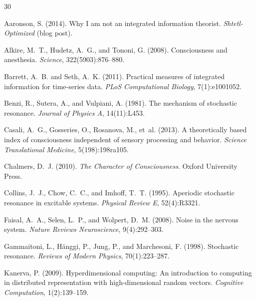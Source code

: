 \documentclass[12pt,a4paper]{article}
\begin{document}

\begin{thebibliography}{30}

Aaronson, S. (2014).
\newblock Why I am not an integrated information theorist.
\newblock \emph{Shtetl-Optimized} (blog post).

Alkire, M.~T., Hudetz, A.~G., and Tononi, G. (2008).
\newblock Consciousness and anesthesia.
\newblock \emph{Science}, 322(5903):876--880.

Barrett, A.~B. and Seth, A.~K. (2011).
\newblock Practical measures of integrated information for time-series data.
\newblock \emph{PLoS Computational Biology}, 7(1):e1001052.

Benzi, R., Sutera, A., and Vulpiani, A. (1981).
\newblock The mechanism of stochastic resonance.
\newblock \emph{Journal of Physics A}, 14(11):L453.

Casali, A.~G., Gosseries, O., Rosanova, M., et~al. (2013).
\newblock A theoretically based index of consciousness independent of sensory processing and behavior.
\newblock \emph{Science Translational Medicine}, 5(198):198ra105.

Chalmers, D.~J. (2010).
\newblock \emph{The Character of Consciousness}.
\newblock Oxford University Press.

Collins, J.~J., Chow, C.~C., and Imhoff, T.~T. (1995).
\newblock Aperiodic stochastic resonance in excitable systems.
\newblock \emph{Physical Review E}, 52(4):R3321.

Faisal, A.~A., Selen, L.~P., and Wolpert, D.~M. (2008).
\newblock Noise in the nervous system.
\newblock \emph{Nature Reviews Neuroscience}, 9(4):292--303.

Gammaitoni, L., H{\"a}nggi, P., Jung, P., and Marchesoni, F. (1998).
\newblock Stochastic resonance.
\newblock \emph{Reviews of Modern Physics}, 70(1):223--287.

Kanerva, P. (2009).
\newblock Hyperdimensional computing: An introduction to computing in distributed representation with high-dimensional random vectors.
\newblock \emph{Cognitive Computation}, 1(2):139--159.


\end{thebibliography}
\end{document}

